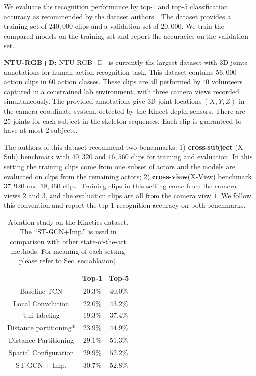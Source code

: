 \documentclass[letterpaper]{article} %
\begin{document}
We evaluate the recognition performance by  top-$1 $ and  top-$5 $ classification accuracy as recommended by the dataset authors~\cite{Kay2017Kinetics}.
The dataset provides a training set of $ 240,000 $ clips and a validation set of $ 20,000 $.
We train the compared models on the training set and report the accuracies on the validation set.


\textbf{NTU-RGB+D:}
NTU-RGB+D~\cite{Shahroudy2016CVPR} is currently the largest dataset with 3D joints annotations for human action recognition task.
This dataset contains $ 56,000 $ action clips in $60$ action classes.
These clips are all performed by $ 40 $ volunteers captured in a constrained lab environment, with three camera views recorded simultaneously.
The provided annotations give 3D joint locations $ (X, Y, Z) $ in the camera coordinate system, detected by the Kinect depth sensors.
There are $ 25 $ joints for each subject in the skeleton sequences.
Each clip is guaranteed to have at most $ 2 $ subjects.

The authors of this dataset recommend two benchmarks:
1) \textbf{cross-subject} (X-Sub) benchmark with $ 40,320 $ and $ 16,560 $ clips for training and evaluation. In this setting the training clips come from one subset of actors and the models are evaluated on clips from the remaining actors;
2) \textbf{cross-view}(X-View) benchmark $ 37,920 $ and $ 18,960 $ clips. Training clips in this setting come from the camera views $ 2 $ and $ 3 $, and the evaluation clips are all from the camera view $ 1 $.
We follow this convention and report the top-$1$ recognition accuracy on both benchmarks.



\begin{table}
	\centering
	\begin{tabular}{c|c|c}
		\hline
		& Top-1 & Top-5 \\ \hline
		Baseline TCN			& 	$20.3\%$ & $40.0\%$\\\hline
		Local Convolution	& 	$22.0\%$ &$43.2\%$ \\\hline
		Uni-labeling	& $19.3\%$	& $37.4\%$\\
		Distance partitioning*	& $23.9\%$	&$44.9\%$  \\
		Distance Partitioning	& $29.1\%$& $51.3\%$ \\
		Spatial Configuration	& $29.9\%$& $52.2\%$ \\\hline
		ST-GCN + Imp.					& $\mathbf{30.7\%}$& $\mathbf{52.8\%}$ \\\hline
	\end{tabular}
	\caption{Ablation study on the Kinetics dataset. The ``ST-GCN+Imp.'' is used in comparison with other state-of-the-art methods.
		For meaning of each setting please refer to Sec.\ref{sec:ablation}. }\label{tab:ablation}
\end{table}
\end{document}

